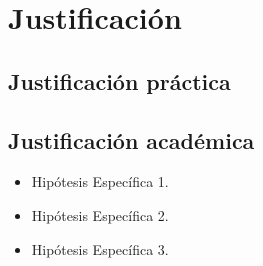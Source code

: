 \section{Justificación}
\subsection{Justificación práctica}
	
\lipsum[1]
	
\subsection{Justificación académica}
\begin{itemize}
\item Hipótesis Específica 1.

\item Hipótesis Específica 2.

\item Hipótesis Específica 3.

\end{itemize}





